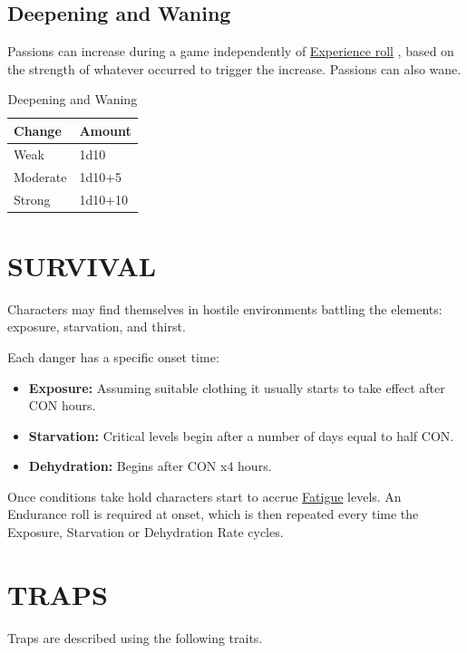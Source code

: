 \documentclass[10pt]{article}
\begin{document}
\subsection{Deepening and Waning}
Passions can increase during a game independently of \hyperref[sec:improvement]{Experience roll} , based on the strength of whatever occurred to trigger the increase. Passions can also wane.

\begin{table}[h]
\centering
\caption{Deepening and Waning}
\label{tab:passion-change}
\begin{tabular}{ll}
\toprule
\textbf{Change} & \textbf{Amount} \\
\midrule
Weak & 1d10 \\
Moderate & 1d10+5 \\
Strong & 1d10+10 \\
\bottomrule
\end{tabular}
\end{table}

\section{SURVIVAL}
\label{sec:survival}
Characters may find themselves in hostile environments battling the elements: exposure, starvation, and thirst.

Each danger has a specific onset time:
\begin{itemize}[leftmargin=*]
    \item \textbf{Exposure:} Assuming suitable clothing it usually starts to take effect after CON hours.
    \item \textbf{Starvation:} Critical levels begin after a number of days equal to half CON.
    \item \textbf{Dehydration:} Begins after CON x4 hours.
\end{itemize}

Once conditions take hold characters start to accrue \hyperref[sec:fatigue]{Fatigue} levels. An Endurance roll is required at onset, which is then repeated every time the Exposure, Starvation or Dehydration Rate cycles.

\section{TRAPS}
\label{sec:traps}
Traps are described using the following traits.
\end{document}
